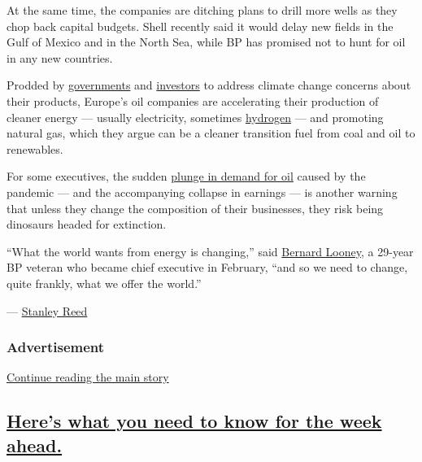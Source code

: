 At the same time, the companies are ditching plans to drill more wells
as they chop back capital budgets. Shell recently said it would delay
new fields in the Gulf of Mexico and in the North Sea, while BP has
promised not to hunt for oil in any new countries.

Prodded by
\href{https://www.nytimes3xbfgragh.onion/2019/10/07/business/energy-environment/oil-companies-climate-change-profits.html}{governments}
and
\href{https://www.nytimes3xbfgragh.onion/2020/01/31/business/church-of-england-climate-change.html}{investors}
to address climate change concerns about their products, Europe's oil
companies are accelerating their production of cleaner energy ---
usually electricity, sometimes
\href{https://www.nytimes3xbfgragh.onion/2019/10/07/business/energy-environment/oil-companies-climate-change-profits.html}{hydrogen}
--- and promoting natural gas, which they argue can be a cleaner
transition fuel from coal and oil to renewables.

For some executives, the sudden
\href{https://www.nytimes3xbfgragh.onion/2020/07/30/business/shell-and-total-report-big-drop-in-profits-but-made-clean-energy-investments.html?searchResultPosition=8}{plunge
in demand for oil} caused by the pandemic --- and the accompanying
collapse in earnings --- is another warning that unless they change the
composition of their businesses, they risk being dinosaurs headed for
extinction.

``What the world wants from energy is changing,'' said
\href{https://www.nytimes3xbfgragh.onion/2019/10/04/business/bp-ceo-bob-dudley-bernard-looney.html}{Bernard
Looney}, a 29-year BP veteran who became chief executive in February,
``and so we need to change, quite frankly, what we offer the world.''

--- \href{https://www.nytimes3xbfgragh.onion/by/stanley-reed}{Stanley
Reed}

\hypertarget{advertisement-1}{%
\subsubsection{Advertisement}\label{advertisement-1}}

\protect\hyperlink{after-dfp-ad-mid2}{Continue reading the main story}

\hypertarget{heres-what-you-need-to-know-for-the-week-ahead}{%
\subsection{\texorpdfstring{\protect\hyperlink{heres-what-you-need-to-know-for-the-week-ahead}{Here's
what you need to know for the week
ahead.}}{Here's what you need to know for the week ahead.}}\label{heres-what-you-need-to-know-for-the-week-ahead}}

